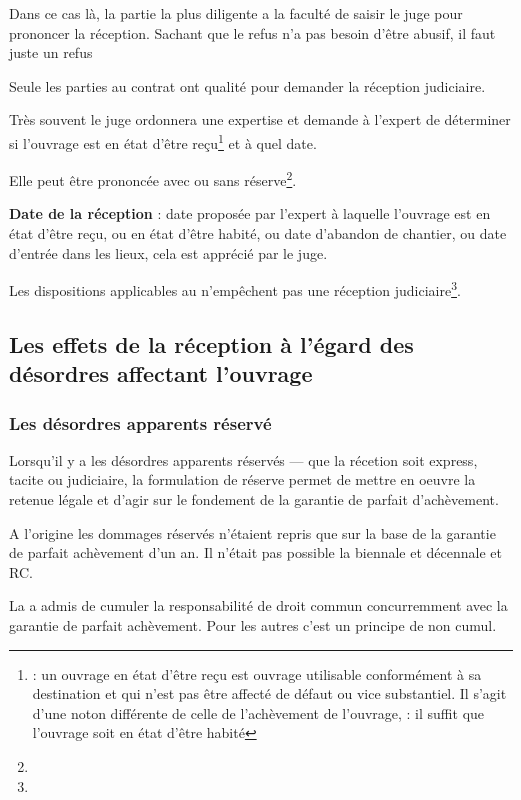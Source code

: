			Dans ce cas là, la partie la plus diligente a la faculté de saisir le juge pour prononcer la réception. Sachant que le refus n’a pas besoin d’être abusif, il faut juste un refus

			Seule les parties au contrat ont qualité pour demander la réception judiciaire.

			Très souvent le juge ordonnera une expertise et demande à l’expert de déterminer si l’ouvrage est en état d’être reçu\footnote{ : un ouvrage en état d’être reçu est ouvrage utilisable conformément à sa destination et qui n'est pas être affecté de défaut ou vice substantiel. Il s'agit d'une noton différente de celle de l'achèvement de l’ouvrage,  : il suffit que l’ouvrage soit en état d’être habité} et à quel date.

			Elle peut être prononcée avec ou sans réserve\footnote{}.

			\textbf{Date de la réception} : date proposée par l’expert à laquelle l'ouvrage est en état d’être reçu, ou en état d’être habité, ou date d’abandon de chantier, ou date d’entrée dans les lieux, cela est apprécié par le juge.

			Les dispositions applicables au \CCMI n’empêchent pas une réception judiciaire\footnote{}.

	\subsection{Les effets de la réception à l'égard des désordres affectant l'ouvrage}



		\subsubsection{Les désordres apparents réservé}

		Lorsqu'il y a les désordres apparents réservés --- que la récetion soit express, tacite ou judiciaire, la formulation de réserve permet de mettre en oeuvre la retenue légale et d’agir sur le fondement de la garantie de parfait d’achèvement.

		A l’origine les dommages réservés n’étaient repris que sur la base de la garantie de parfait achèvement d’un an.
		Il n’était pas possible la biennale et décennale et RC.

		La \CourDeCas a admis de cumuler la responsabilité de droit commun concurremment avec la garantie de parfait achèvement. Pour les autres \garSpec c’est un principe de non cumul.

